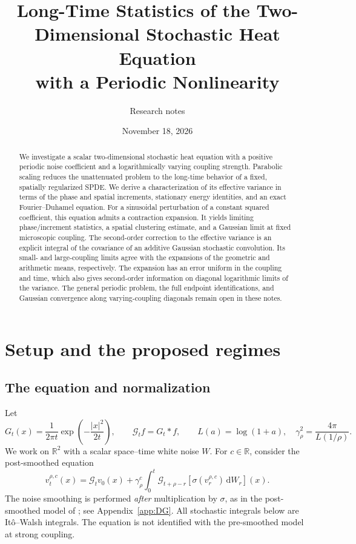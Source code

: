 \documentclass[11pt]{article}
\title{Long-Time Statistics of the Two-Dimensional Stochastic Heat Equation\\with a Periodic Nonlinearity}
\author{Research notes}
\date{November 18, 2026}
\numberwithin{equation}{section}
\theoremstyle{definition}
\theoremstyle{remark}
\newcommand{\R}{\mathbb R}
\newcommand{\clG}{\mathcal G}
\newcommand{\dd}{\,\mathrm d}
\begin{document}
\maketitle
\begin{abstract}
We investigate a scalar two-dimensional stochastic heat equation with a positive periodic noise coefficient and a logarithmically varying coupling strength. Parabolic scaling reduces the unattenuated problem to the long-time behavior of a fixed, spatially regularized SPDE. We derive a characterization of its effective variance in terms of the phase and spatial increments, stationary energy identities, and an exact Fourier--Duhamel equation. For a sinusoidal perturbation of a constant squared coefficient, this equation admits a contraction expansion. It yields limiting phase/increment statistics, a spatial clustering estimate, and a Gaussian limit at fixed microscopic coupling. The second-order correction to the effective variance is an explicit integral of the covariance of an additive Gaussian stochastic convolution. Its small- and large-coupling limits agree with the expansions of the geometric and arithmetic means, respectively. The expansion has an error uniform in the coupling and time, which also gives second-order information on diagonal logarithmic limits of the variance. The general periodic problem, the full endpoint identifications, and Gaussian convergence along varying-coupling diagonals remain open in these notes.
\end{abstract}
\tableofcontents

\section{Setup and the proposed regimes}
\subsection{The equation and normalization}
Let
\[
 G_t(x)=\frac{1}{2\pi t}\exp\left(-\frac{|x|^2}{2t}\right),\qquad
 \clG_t f=G_t*f,\qquad L(a)=\log(1+a),\quad
 \gamma_\rho^2=\frac{4\pi}{L(1/\rho)}.
\]
We work on $\R^2$ with a scalar space--time white noise $W$. For $c\in\R$, consider the post-smoothed equation
\begin{equation}\label{eq:original}
 v_t^{\rho,c}(x)=\clG_t v_0(x)+\gamma_\rho^c
 \int_0^t\clG_{t+\rho-r}[\sigma(v_r^{\rho,c})\dd W_r](x).
\end{equation}
The noise smoothing is performed \emph{after} multiplication by $\sigma$, as in the post-smoothed model of \cite{DG}; see Appendix~\ref{app:DG}. All stochastic integrals below are It\^o--Walsh integrals. The equation is not identified with the pre-smoothed model at strong coupling.
\end{document}
